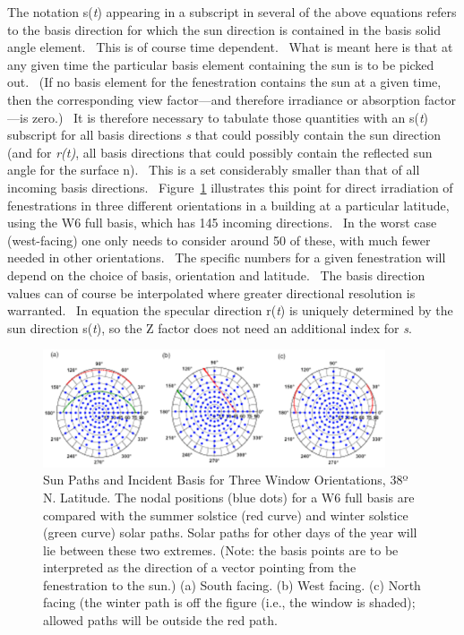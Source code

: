The notation s(\emph{t}) appearing in a subscript in several of the above equations refers to the basis direction for which the sun direction is contained in the basis solid angle element.~ This is of course time dependent.~ What is meant here is that at any given time the particular basis element containing the sun is to be picked out.~ (If no basis element for the fenestration contains the sun at a given time, then the corresponding view factor---and therefore irradiance or absorption factor---is zero.)~ It is therefore necessary to tabulate those quantities with an s(\emph{t}) subscript for all basis directions \emph{s} that could possibly contain the sun direction (and for \emph{r(t)}, all basis directions that could possibly contain the reflected sun angle for the surface n).~ This is a set considerably smaller than that of all incoming basis directions.~ Figure~\ref{fig:sun-paths-and-incident-basis-for-three-window} illustrates this point for direct irradiation of fenestrations in three different orientations in a building at a particular latitude, using the W6 full basis, which has 145 incoming directions.~ In the worst case (west-facing) one only needs to consider around 50 of these, with much fewer needed in other orientations.~ The specific numbers for a given fenestration will depend on the choice of basis, orientation and latitude.~ The basis direction values can of course be interpolated where greater directional resolution is warranted.~ In equation the specular direction r(\emph{t}) is uniquely determined by the sun direction s(\emph{t}), so the Z factor does not need an additional index for \emph{s}.

\begin{figure}[hbtp] %
\centering
\includegraphics[width=0.9\textwidth, height=0.9\textheight, keepaspectratio=true]{media/image1410.png}
\caption{Sun Paths and Incident Basis for Three Window Orientations, 38º N. Latitude. The nodal positions (blue dots) for a W6 full basis are compared with the summer solstice (red curve) and winter solstice (green curve) solar paths. Solar paths for other days of the year will lie between these two extremes. (Note: the basis points are to be interpreted as the direction of a vector pointing from the fenestration to the sun.) (a) South facing. (b) West facing. (c) North facing (the winter path is off the figure (i.e., the window is shaded); allowed paths will be outside the red path. \protect \label{fig:sun-paths-and-incident-basis-for-three-window}}
\end{figure}

